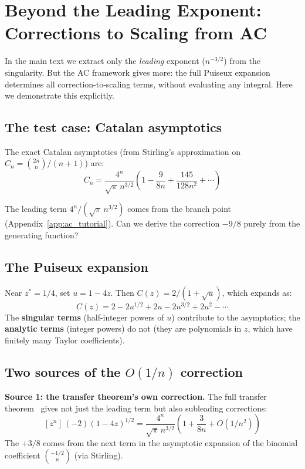 \documentclass[11pt,a4paper]{article}
\theoremstyle{definition}
\begin{document}
\section{Beyond the Leading Exponent: Corrections to Scaling from AC}
\label{app:corrections}

In the main text we extract only the \emph{leading} exponent ($n^{-3/2}$)
from the singularity. But the AC framework gives more: the full Puiseux
expansion determines all correction-to-scaling terms, without evaluating
any integral. Here we demonstrate this explicitly.

\subsection{The test case: Catalan asymptotics}

The exact Catalan asymptotics (from Stirling's approximation on
$C_n = \binom{2n}{n}/(n{+}1)$) are:
\begin{equation}
C_n = \frac{4^n}{\sqrt{\pi}\, n^{3/2}}
\left(1 - \frac{9}{8n} + \frac{145}{128n^2} + \cdots\right)
\label{eq:catalan_corrections}
\end{equation}

The leading term $4^n/(\sqrt{\pi}\, n^{3/2})$ comes from the branch point
(Appendix~\ref{app:ac_tutorial}). Can we derive the correction $-9/8$
purely from the generating function?

\subsection{The Puiseux expansion}

Near $z^* = 1/4$, set $u = 1 - 4z$. Then $C(z) = 2/(1 + \sqrt{u})$,
which expands as:
\[
C(z) = 2 - 2u^{1/2} + 2u - 2u^{3/2} + 2u^2 - \cdots
\]
The \textbf{singular terms} (half-integer powers of $u$) contribute to
the asymptotics; the \textbf{analytic terms} (integer powers) do not
(they are polynomials in $z$, which have finitely many Taylor coefficients).

\subsection{Two sources of the $O(1/n)$ correction}

\textbf{Source 1: the transfer theorem's own correction.}
The full transfer theorem~\cite{flajolet2009} gives not just the leading
term but also subleading corrections:
\[
[z^n]\, (-2)(1{-}4z)^{1/2} = \frac{4^n}{\sqrt{\pi}\, n^{3/2}}
\left(1 + \frac{3}{8n} + O(1/n^2)\right)
\]
The $+3/8$ comes from the next term in the asymptotic expansion of the
binomial coefficient $\binom{-1/2}{n}$ (via Stirling).
\end{document}
